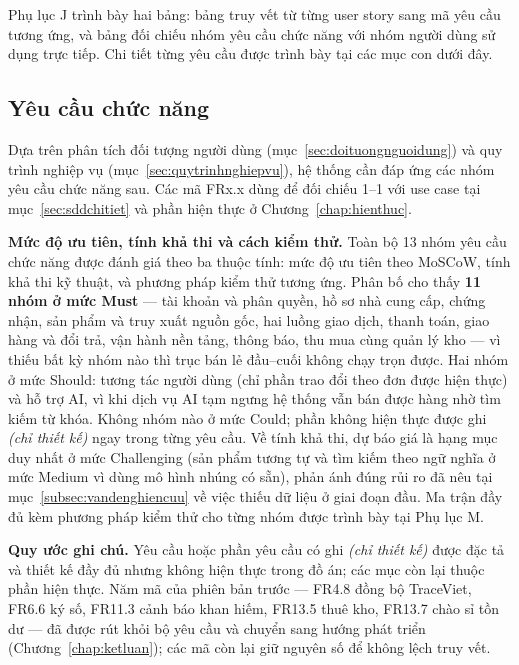 Phụ lục J trình bày hai bảng: bảng truy vết từ từng user story sang mã yêu cầu tương ứng, và bảng đối chiếu nhóm yêu cầu chức năng với nhóm người dùng sử dụng trực tiếp. Chi tiết từng yêu cầu được trình bày tại các mục con dưới đây.

\subsection{Yêu cầu chức năng}
\label{sec:yeucauchucnang}

Dựa trên phân tích đối tượng người dùng (mục~\ref{sec:doituongnguoidung}) và
quy trình nghiệp vụ (mục~\ref{sec:quytrinhnghiepvu}), hệ thống cần đáp ứng các
nhóm yêu cầu chức năng sau. Các mã FRx.x dùng để đối chiếu 1--1 với use case
tại mục~\ref{sec:sddchitiet} và phần hiện thực ở Chương~\ref{chap:hienthuc}.

\noindent\textbf{Mức độ ưu tiên, tính khả thi và cách kiểm thử.} Toàn bộ 13 nhóm yêu cầu chức năng được đánh giá theo ba thuộc tính: mức độ ưu tiên theo MoSCoW, tính khả thi kỹ thuật, và phương pháp kiểm thử tương ứng. Phân bố cho thấy \textbf{11 nhóm ở mức Must} --- tài khoản và phân quyền, hồ sơ nhà cung cấp, chứng nhận, sản phẩm và truy xuất nguồn gốc, hai luồng giao dịch, thanh toán, giao hàng và đổi trả, vận hành nền tảng, thông báo, thu mua cùng quản lý kho --- vì thiếu bất kỳ nhóm nào thì trục bán lẻ đầu--cuối không chạy trọn được. Hai nhóm ở mức Should: tương tác người dùng (chỉ phần trao đổi theo đơn được hiện thực) và hỗ trợ AI, vì khi dịch vụ AI tạm ngưng hệ thống vẫn bán được hàng nhờ tìm kiếm từ khóa. Không nhóm nào ở mức Could; phần không hiện thực được ghi \emph{(chỉ thiết kế)} ngay trong từng yêu cầu. Về tính khả thi, dự báo giá là hạng mục duy nhất ở mức Challenging (sản phẩm tương tự và tìm kiếm theo ngữ nghĩa ở mức Medium vì dùng mô hình nhúng có sẵn), phản ánh đúng rủi ro đã nêu tại mục~\ref{subsec:vandenghiencuu} về việc thiếu dữ liệu ở giai đoạn đầu. Ma trận đầy đủ kèm phương pháp kiểm thử cho từng nhóm được trình bày tại Phụ lục M.

\noindent\textbf{Quy ước ghi chú.} Yêu cầu hoặc phần yêu cầu có ghi \emph{(chỉ thiết kế)} được đặc tả và thiết kế đầy đủ nhưng không hiện thực trong đồ án; các mục còn lại thuộc phần hiện thực. Năm mã của phiên bản trước --- FR4.8 đồng bộ TraceViet, FR6.6 ký số, FR11.3 cảnh báo khan hiếm, FR13.5 thuê kho, FR13.7 chào sỉ tồn dư --- đã được rút khỏi bộ yêu cầu và chuyển sang hướng phát triển (Chương~\ref{chap:ketluan}); các mã còn lại giữ nguyên số để không lệch truy vết.

